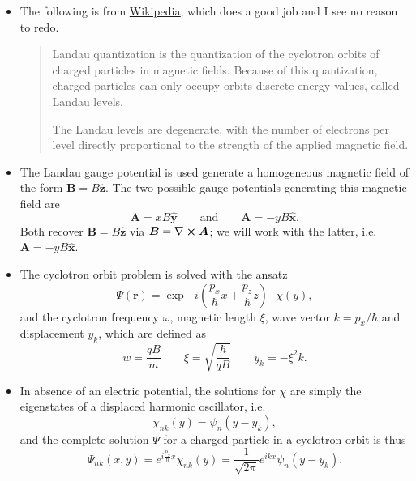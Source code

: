 \documentclass[11pt, a4paper]{article}
\renewcommand{\curl}{\nabla \cross}
\newcommand{\eqtext}[1]{\qquad \text{#1} \qquad}
\renewcommand{\vec}[1]{\bm{#1}}  %
\newcommand{\uvec}[1]{\hat{\vec{#1}}}  %
\renewcommand{\r}{\vec{r}}  %
\newcommand{\A}{\vec{A}}  %
\newcommand{\B}{\vec{B}}  %
\renewcommand{\P}{\Psi}  %
\begin{document}
\begin{itemize}

    \item The following is from \href{https://en.wikipedia.org/wiki/Landau\_quantization}{\underline{Wikipedia}}, which does a good job and I see no reason to redo.
    \begin{quote}
        Landau quantization is the quantization of the cyclotron orbits of charged particles in magnetic fields. Because of this quantization, charged particles can only occupy orbits discrete energy values, called Landau levels. 

        The Landau levels are degenerate, with the number of electrons per level directly proportional to the strength of the applied magnetic field. 
    \end{quote}

    	\item The Landau gauge potential is used generate a homogeneous magnetic field of the form $ \B = B \uvec{z} $. The two possible gauge potentials generating this magnetic field are
	\begin{equation*}
		\A = x B \uvec{y} \eqtext{and} \A = - y B \uvec{x}.
	\end{equation*}
	Both recover $ \B = B \uvec{z} $ via $ \B = \curl \A $; we will work with the latter, i.e. $ \A = - y B \uvec{x} $.

    \item The cyclotron orbit problem is solved with the ansatz
    \begin{equation*}
		\P(\r) = \exp\left[i \left(\frac{p_{x}}{\hbar}x + \frac{p_{z}}{\hbar}z \right)\right]\chi(y),
    \end{equation*}
    and the cyclotron frequency $ \omega $, magnetic length $ \xi $, wave vector $ k = p_{x}/\hbar $ and displacement $ y_{k} $, which are defined as
    \begin{equation*}
        w = \frac{q B}{m} \qquad \xi = \sqrt{\frac{\hbar}{qB}} \qquad y_{k} = - \xi^{2}k.
    \end{equation*}

	\item In absence of an electric potential, the solutions for $ \chi $ are simply the eigenstates of a displaced harmonic oscillator, i.e.
	\begin{equation*}
		\chi_{nk}(y) = \psi_{n}(y - y_{k}),
	\end{equation*}
	and the complete solution $ \Psi $ for a charged particle in a cyclotron orbit is thus
	\begin{equation*}
		\P_{nk}(x, y) = e^{i\frac{p_{x}}{\hbar}x}\chi_{nk}(y) = \frac{1}{\sqrt{2\pi}}e^{ikx} \psi_{n}(y - y_{k}).
	\end{equation*}


\end{itemize}
\end{document}
